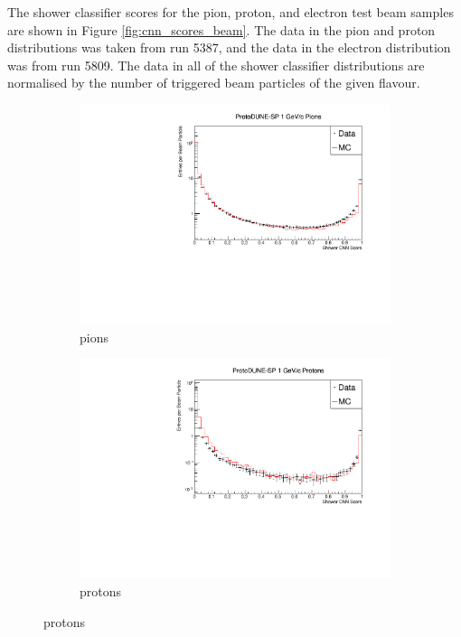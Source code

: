 The shower classifier scores for the pion, proton, and electron test beam 
samples are shown in Figure \ref{fig:cnn_scores_beam}. The data in the pion 
and proton distributions was taken from \protodune{} run 5387, and the data in 
the electron distribution was from run 5809. The data in all of the shower 
classifier distributions are normalised by the number of triggered beam 
particles of the given flavour.
\begin{figure}

	\centering

	\begin{subfigure}[b]{0.7\textwidth}
		\centering
		\includegraphics[width=\textwidth]{figures/hit_cnn_pion.pdf}
		\caption {pions}
		\label{fig:beam_pi_cnn}
	\end{subfigure}

	\begin{subfigure}[b]{0.7\textwidth}
		\centering
		\includegraphics[width=\textwidth]{figures/hit_cnn_proton.pdf}
		\caption {protons}
		\label{fig:beam_proton_cnn}
	\end{subfigure}


\end{figure}
